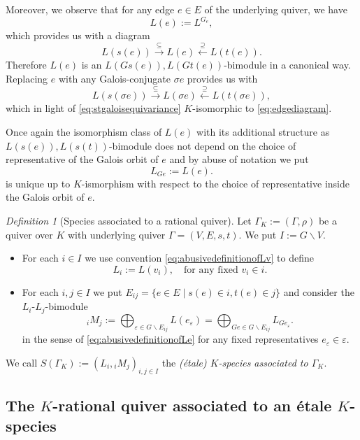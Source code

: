 \documentclass[a4paper,12pt,reqno]{amsart}
\theoremstyle{plain}
\theoremstyle{remark}
\newtheorem{definition}[theorem]{Definition}
\begin{document}
  Moreover, we observe that for any edge $e\in E$ of the underlying quiver, we have 
  \[
  L(e):=L^{G_{e}},
  \]
  which provides us with a diagram
  \begin{equation}
    L(s(e))\xrightarrow\subseteq L(e)\xleftarrow\supseteq L(t(e)).
    \label{eq:edgediagram}
  \end{equation}
  Therefore $L(e)$ is an $L(Gs(e)),L(Gt(e))$-bimodule in a canonical way. Replacing $e$ with any Galois-conjugate $\sigma e$ provides us with
  \[
  L(s(\sigma e))\xrightarrow\subseteq L(\sigma e)\xleftarrow\supseteq L(t(\sigma e)),
  \]
  which in light of \eqref{eq:stgaloisequivariance} $K$-isomorphic to \eqref{eq:edgediagram}.
  
  Once again the isomorphism class of $L(e)$ with its additional structure as $L(s(e)),L(s(t))$-bimodule does not depend on the choice of representative of the Galois orbit of $e$ and by abuse of notation we put
  \begin{equation}
    L_{Ge}:=L(e).
    \label{eq:abusivedefinitionofLe}
  \end{equation}
  is unique up to $K$-ismorphism with respect to the choice of representative inside the Galois orbit of $e$.

  \begin{definition}[Species associated to a rational quiver]
    Let $\Gamma_K:=(\Gamma,\rho)$ be a quiver over $K$ with underlying quiver $\Gamma=(V,E,s,t)$. We put $I:=G\backslash V$.
    \begin{itemize}
      \item[(i)] For each $i\in I$ we use convention \eqref{eq:abusivedefinitionofLv} to define
      \[
      L_i:=L(v_i),\quad\text{for any fixed } v_i\in i.
      \]
      \item[(ii)] For each $i,j\in I$ we put $E_{ij} = \{ e \in E \mid s(e) \in i, t(e) \in j \}$ and consider the $L_i$-$L_j$-bimodule
      \[
        {}_iM_j :=\bigoplus_{\varepsilon\in G\backslash E_{ij}} L(e_\varepsilon)= \bigoplus_{Ge \in G\backslash E_{ij}} L_{Ge_\varepsilon}.
      \]
      in the sense of \eqref{eq:abusivedefinitionofLe} for any fixed representatives $e_\varepsilon\in\varepsilon$.
    \end{itemize}
    We call $S(\Gamma_K):=(L_i,{}_iM_j)_{i,j\in I}$ the {\em (\'etale) $K$-species associated to $\Gamma_K$}.
  \end{definition}

  \subsection{The $K$-rational quiver associated to an \'etale $K$-species}
  
\end{document}
